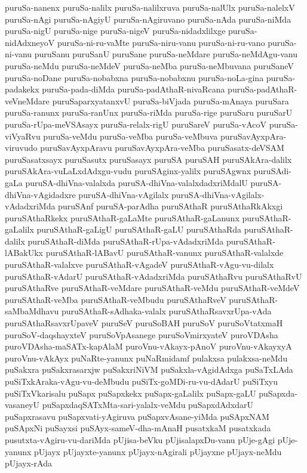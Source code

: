 {puruSa-nanenx
puruSa-nalilx
puruSa-nalilxruva
puruSa-nalUlx
puruSa-nalelxV
puruSa-nAgi
puruSa-nAgiyU
puruSa-nAgiruvano
puruSa-nAda
puruSa-niMda
puruSa-nigU
puruSa-nige
puruSa-nigeV
puruSa-nidadxlilxge
puruSa-nidAdxneyoV
puruSa-ni-ru-vaMte
puruSa-niru-vanu
puruSa-ni-ru-vano
puruSa-ni-vanu
puruSanu
puruSanU
puruSane
puruSa-neMdare
puruSa-neMdAgu-vanu
puruSa-neMdu
puruSa-neMdeV
puruSa-neMba
puruSa-neMbuvana
puruSaneV
puruSa-noDane
puruSa-nobabxna
puruSa-nobabxnu
puruSa-noLa-gina
puruSa-padakekx
puruSa-pada-diMda
puruSa-padAthaR-nivaRcana
puruSa-padAthaR-veVneMdare
puruSaparxyatanxvU
puruSa-biVjada
puruSa-mAnaya
puruSara
puruSa-ranunx
puruSa-ranUnx
puruSa-riMda
puruSa-rige
puruSaru
puruSarU
puruSa-rUpa-meVSAsayx
puruSa-relalx-rigU
puruSareV
puruSa-vAcoV
puruSa-viVyaRvu
puruSa-veMdu
puruSa-veMba
puruSa-veMbuva
puruSavAyxpAra-viruvudo
puruSavAyxpAravu
puruSavAyxpAra-veMba
puruSasatx-deVSAM
puruSasatxsayx
puruSasutx
puruSasayx
puruSA
puruSAH
puruSAkAra-dalilx
puruSAkAra-vuLaLxdAdxgu-vudu
puruSAginx-yalilx
puruSAgwnx
puruSAdi-gaLa
puruSA-dhiVna-valalxda
puruSA-dhiVna-valalxdadxriMdalU
puruSA-dhiVna-vAgidadxre
puruSA-dhiVna-vAgilalx
puruSA-dhiVna-vAgilalx-vAdadxriMda
puruSAnf
puruSA-parAdha
puruSAthaR
puruSAthaRkAkxgi
puruSAthaRkekx
puruSAthaR-gaLaMte
puruSAthaR-gaLanunx
puruSAthaR-gaLalilx
puruSAthaR-gaLigU
puruSAthaR-gaLU
puruSAthaRda
puruSAthaR-dalilx
puruSAthaR-diMda
puruSAthaR-rUpa-vAdadxriMda
puruSAthaR-lABakUkx
puruSAthaR-lABavU
puruSAthaR-vanunx
puruSAthaR-valalxde
puruSAthaR-valalxve
puruSAthaR-vAgadeV
puruSAthaR-vAgu-vu-dilalx
puruSAthaR-vAdarU
puruSAthaR-vAdadxriMda
puruSAthaRvu
puruSAthaRvU
puruSAthaRve
puruSAthaR-veMdare
puruSAthaR-veMdu
puruSAthaR-veMdeV
puruSAthaR-veMba
puruSAthaR-veMbudu
puruSAthaRveV
puruSAthaR-saMbaMdhavu
puruSAthaR-sAdhaka-valalx
puruSAthaRsavxrUpa-vAda
puruSAthaRsavxrUpaveV
puruSeV
puruSoBAH
puruSoV
puruSoVtatxmaH
puruSoV-daqshayxteV
puruSoVpAsanege
puruSoVmirxyateV
puroVDAsha
puroVDAsha-maSATx-kapAlaM
puroVnu-vAkayx-pAnoV
puroVnu-vAkayxyA
puroVnu-vAkAyx
puNaRte-yanunx
puNaRmidamf
pulakxsa
pulakxsa-neMdu
puSakxra
puSakxrasarxjw
puSakxriNiVM
puSakxla-vAgidAdxga
puSaTxLAda
puSiTxkAraka-vAgu-vu-deMbudu
puSiTx-goMDi-ru-vu-dAdarU
puSiTxyu
puSiTxVkarisalu
puSapx
puSapxkekx
puSapx-gaLalilx
puSapx-gaLU
puSapxda-vasaneyU
puSapxdaqSATxMta-sari-yalalx-veMdu
puSapxdAdxdarU
puSapxrasavu
puSapxvati-yAgiruva
puSapxvAsane-yiMda
puSApxNAM
puSApxNi
puSayxsi
puSAyx-sameV-dha-mAnaH
pusatxkaM
pusatxkada
pusutxta-vAgiru-vu-dariMda
pUjisa-beVku
pUjisalapxDu-vanu
pUje-gAgi
pUje-yanunx
pUjayx
pUjayxte-yanunx
pUjayx-nAgirali
pUjayxne
pUjayx-neMdu
pUjayx-rAda
}
